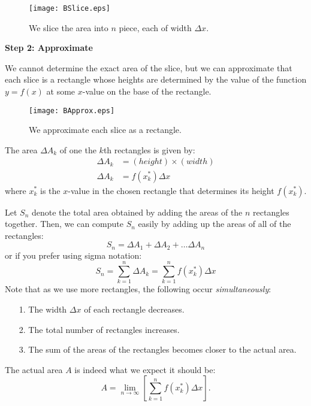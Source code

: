 \documentclass{ximera}
\begin{document}
\begin{figure}[h!]
  \centering 
  \texttt{[image: BSlice.eps]}
  \caption{We slice the area into $n$ piece, each of width $\Delta x$.}
\end{figure}


\textbf{Step 2: Approximate}

We cannot determine the exact area of the slice, but we can approximate that each slice is a rectangle whose heights are determined by the value of the function $y = f(x)$ at some $x$-value on the base of the rectangle. 
\begin{figure}[h!]
  \centering 
  \texttt{[image: BApprox.eps]}
   \caption{We approximate each slice as a rectangle.}
\end{figure}

\vspace{3mm}
The area $\Delta A_k$ of one the $k$th rectangles is given by: 
\begin{align}
\Delta A_k & = (height) \times (width) \nonumber \\
\Delta A_k &= f\left(x_k^*\right)\Delta x \label{area}
\end{align}
where $x_k^*$ is the $x$-value in the chosen rectangle that determines its height $f(x_k^*)$. 

\vspace{3mm}
Let $S_n$ denote the total area obtained by adding the areas of the $n$ rectangles together.   Then, we can compute $S_n$ easily by adding up the areas of all of the rectangles: $$S_n = \Delta A_1 + \Delta A_2 + \ldots \Delta A_n$$
or if you prefer using sigma notation: 
\begin{equation}
S_n =\sum_{k=1}^{n} \Delta A_k =  \sum_{k=1}^n f(x_k^*) \Delta x  \label{areasum}
\end{equation}
Note that as we use more rectangles, the following occur \emph{simultaneously}:

\begin{itemize}
\item[1.] The width $\Delta x$ of each rectangle decreases.
\item[2.] The total number of rectangles increases.
\item[3.] The sum of the areas of the rectangles becomes closer to the actual area.
\end{itemize}

The actual area $A$ is indeed what we expect it should be: $$A = \lim_{n \rightarrow \infty} \left[ \sum_{k=1}^n f(x_k^*) \Delta x \right].$$ 
\end{document}
